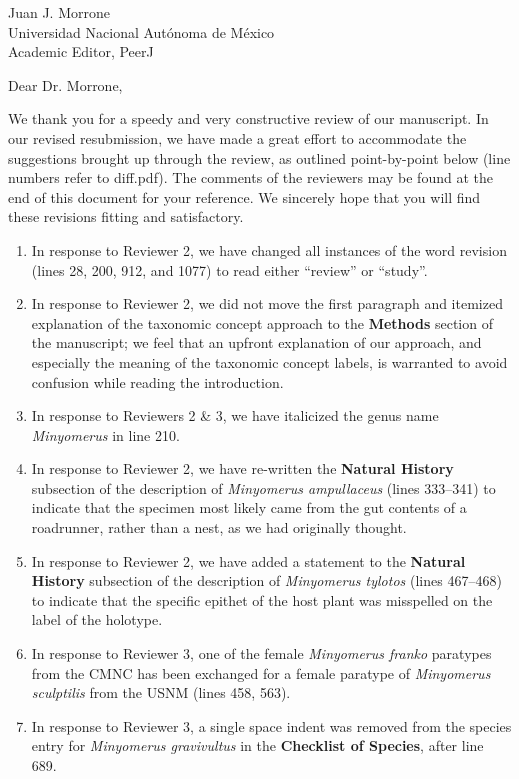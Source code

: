 \documentclass[10pt,letterpaper]{letter}
\begin{document}
 
\begin{letter}{Juan J. Morrone\\Universidad Nacional Aut\'{o}noma de M\'{e}xico\\Academic Editor, PeerJ} 
	\opening{Dear Dr. Morrone,} 

	We thank you for a speedy and very constructive review of our manuscript.
	In our revised resubmission, we have made a great effort to accommodate the suggestions brought up through the review, as outlined point-by-point below (line numbers refer to diff.pdf).
	The comments of the reviewers may be found at the end of this document for your reference.
	We sincerely hope that you will find these revisions fitting and satisfactory.

	\begin{enumerate}
		\item In response to Reviewer 2, we have changed all instances of the word revision (lines 28, 200, 912, and 1077) to read either ``review'' or ``study''.
		\item In response to Reviewer 2, we did not move the first paragraph and itemized explanation of the taxonomic concept approach to the \textbf{Methods} section of the manuscript; we feel that an upfront explanation of our approach, and especially the meaning of the taxonomic concept labels, is warranted to avoid confusion while reading the introduction.
		\item In response to Reviewers 2 \& 3, we have italicized the genus name \textit{Minyomerus} in line 210.
		\item In response to Reviewer 2, we have re-written the \textbf{Natural History} subsection of the description of \textit{Minyomerus ampullaceus} (lines 333--341) to indicate that the specimen most likely came from the gut contents of a roadrunner, rather than a nest, as we had originally thought.
		\item In response to Reviewer 2, we have added a statement to the \textbf{Natural History} subsection of the description of \textit{Minyomerus tylotos} (lines 467--468) to indicate that the specific epithet of the host plant was misspelled on the label of the holotype.
		\item In response to Reviewer 3, one of the female \textit{Minyomerus franko} paratypes from the CMNC has been exchanged for a female paratype of \textit{Minyomerus sculptilis} from the USNM (lines 458, 563).
		\item In response to Reviewer 3, a single space indent was removed from the species entry for \textit{Minyomerus gravivultus} in the \textbf{Checklist of Species}, after line 689.

\end{enumerate}
\end{letter}
\end{document}
